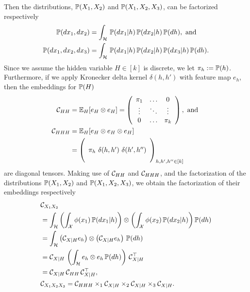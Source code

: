 \documentclass{article}
\begin{document}
Then the distributions, $\mathbb{P}(X_1,X_2)$ and $\mathbb{P}(X_1,X_2,X_3)$, can be factorized respectively
\begin{align*}
	\mathbb{P}(dx_1, dx_2) &= \int_{\mathcal{H}}\, \mathbb{P}(dx_1 | h )\, \mathbb{P}(d x_2 | h)\, \mathbb{P}(dh),~\text{and}\\
	\mathbb{P}(dx_1, dx_2, dx_3) &= \int_{\mathcal{H}}\, \mathbb{P}(dx_1 | h )\, \mathbb{P}(dx_2 | h)\, \mathbb{P}(dx_3 | h)\, \mathbb{P}(dh).
\end{align*}
Since we assume the hidden variable $H \in [k]$ is discrete,
we let $\pi_h:=\mathbb{P}(h)$. Furthermore, if we apply Kronecker delta kernel $\delta(h,h')$ with feature map $e_h$, then the embeddings for $\mathbb{P}(H)$
\begin{align*}
 \mathcal{C}_{HH} &= \mathbb{E}_H[e_H \otimes e_H] = \left(
  \begin{array}{ccc}
    \pi_1& \ldots & 0 \cr
    \vdots & \ddots & \vdots \cr
    0 & \ldots & \pi_k
  \end{array}
 \right),
 ~\text{and}~\\
 \mathcal{C}_{HHH} &= \mathbb{E}_H[e_H \otimes e_H \otimes e_H]  \\
	&= \left(
  \begin{array}{c}
    \cr
    \pi_h\ \delta(h,h')\ \delta(h',h'') \cr
    \cr
  \end{array}
 \right)_{h,h',h''\in[k]}
\end{align*}
are diagonal tensors. Making use of $\mathcal{C}_{HH}$ and $\mathcal{C}_{HHH}$, and the factorization of the distributions $\mathbb{P}(X_1,X_2)$ and $\mathbb{P}(X_1,X_2,X_3)$, we obtain the factorization of their embeddings
respectively
\begin{align}
  &\mathcal{C}_{X_1X_2} \nonumber \\
  &= \int_{\mathcal{H}} \left(\int_{\mathcal{X}} \phi(x_1)\, \mathbb{P}(dx_1|h)\right) \otimes \left(\int_{\mathcal{X}} \phi(x_2)\, \mathbb{P}(dx_2 |h)\right) \mathbb{P}(dh) \nonumber \\
  &= \int_{\mathcal{H}} \left(\mathcal{C}_{X|H} e_h\right) \otimes \left(\mathcal{C}_{X|H} e_h\right)\, \mathbb{P}(dh) \nonumber \\
  &= \mathcal{C}_{X|H}\, \left(\int_{\mathcal{H}} e_h \otimes e_h\, \mathbb{P}(dh)\right)\, \mathcal{C}_{X|H}^\top \nonumber \\
  &= \mathcal{C}_{X|H}\, \mathcal{C}_{HH}\, \mathcal{C}_{X|H}^\top, \label{eq:pair_factorization}\\
  &\mathcal{C}_{X_1 X_2 X_3}
  = \mathcal{C}_{HHH} \times_1 \mathcal{C}_{X|H} \times_2 \mathcal{C}_{X|H} \times_3 \mathcal{C}_{X|H}. \label{eq:triple_factorization}
\end{align}
\end{document}
